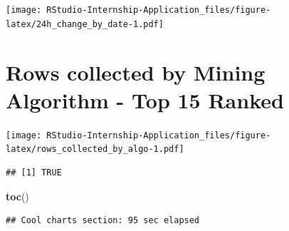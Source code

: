 \documentclass[
]{book}
\newenvironment{Shaded}{\begin{snugshade}}{\end{snugshade}}
\newcommand{\KeywordTok}[1]{\textcolor[rgb]{0.13,0.29,0.53}{\textbf{#1}}}
\newcommand{\NormalTok}[1]{#1}
\begin{document}
\texttt{[image: RStudio-Internship-Application\_files/figure-latex/24h\_change\_by\_date-1.pdf]}

\hypertarget{rows-collected-by-mining-algorithm---top-15-ranked}{%
\section{Rows collected by Mining Algorithm - Top 15 Ranked}\label{rows-collected-by-mining-algorithm---top-15-ranked}}

\texttt{[image: RStudio-Internship-Application\_files/figure-latex/rows\_collected\_by\_algo-1.pdf]}

\begin{verbatim}
## [1] TRUE
\end{verbatim}

\begin{Shaded}
\begin{Highlighting}[]
\KeywordTok{toc}\NormalTok{()}
\end{Highlighting}
\end{Shaded}

\begin{verbatim}
## Cool charts section: 95 sec elapsed
\end{verbatim}

  
\end{document}
